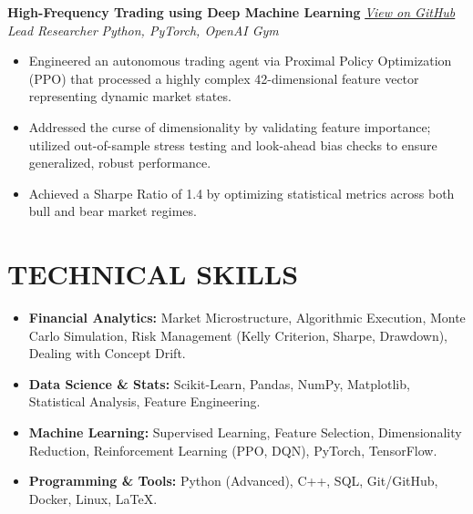 \documentclass[10pt, letterpaper]{article}
\begin{document}
\noindent \textbf{High-Frequency Trading using Deep Machine Learning} \hfill \href{https://github.com/Joeytribb/Bithax-RL-trader}{\textit{View on GitHub}} \\
\textit{Lead Researcher} \hfill \textit{Python, PyTorch, OpenAI Gym}
\begin{itemize}[leftmargin=*, noitemsep, topsep=0pt]
    \item Engineered an autonomous trading agent via Proximal Policy Optimization (PPO) that processed a highly complex 42-dimensional feature vector representing dynamic market states.
    \item Addressed the curse of dimensionality by validating feature importance; utilized out-of-sample stress testing and look-ahead bias checks to ensure generalized, robust performance.
    \item Achieved a Sharpe Ratio of 1.4 by optimizing statistical metrics across both bull and bear market regimes.
\end{itemize}

\section*{TECHNICAL SKILLS}
\begin{itemize}[leftmargin=*, noitemsep, topsep=0pt]
    \item \textbf{Financial Analytics:} Market Microstructure, Algorithmic Execution, Monte Carlo Simulation, Risk Management (Kelly Criterion, Sharpe, Drawdown), Dealing with Concept Drift.
    \item \textbf{Data Science \& Stats:} Scikit-Learn, Pandas, NumPy, Matplotlib, Statistical Analysis, Feature Engineering.
    \item \textbf{Machine Learning:} Supervised Learning, Feature Selection, Dimensionality Reduction, Reinforcement Learning (PPO, DQN), PyTorch, TensorFlow.
    \item \textbf{Programming \& Tools:} Python (Advanced), C++, SQL, Git/GitHub, Docker, Linux, LaTeX.
\end{itemize}
\end{document}
